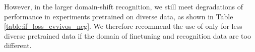 

However, in the larger domain-shift recognition, we still meet degradations of performance in experiments pretrained on diverse data, as shown in Table \ref{table:if_loss_cvvivos_neg}.
We therefore recommend the use of  only for less diverse pretrained data if the domain of finetuning and recognition data are too different.


